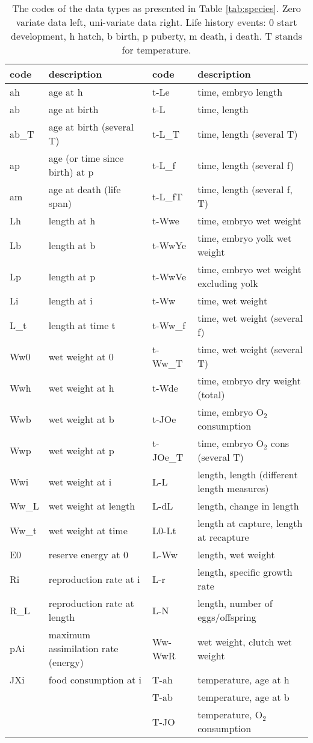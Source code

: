 \documentclass{article}
\begin{document}
\clearpage

\begin{table}[h!]\small
\caption{\label{tab:codes}\protect\small
The codes of the data types as presented in Table \ref{tab:species}.
Zero variate data left, uni-variate data right.
Life history events: 0 start development, h hatch, b birth, p puberty, m death, i death.
T stands for temperature.}
\begin{tabular}{ll|ll} \hline
\textbf{code} & \textbf{description} & \textbf{code} & \textbf{description}\\ \hline
ah & age at h & t-Le & time, embryo length\\ 
ab & age at birth & t-L & time, length\\ 
ab\_T & age at birth (several T) & t-L\_T & time, length (several T)\\ 
ap & age (or time since birth) at p & t-L\_f & time, length (several f)\\ 
am & age at death (life span) & t-L\_fT & time, length (several f, T)\\ 
Lh & length at h & t-Wwe & time, embryo wet weight\\ 
Lb & length at b & t-WwYe & time, embryo yolk wet weight\\ 
Lp & length at p & t-WwVe & time, embryo wet weight excluding yolk\\ 
Li & length at i & t-Ww & time, wet weight\\ 
L\_t & length at time t & t-Ww\_f & time, wet weight (several f)\\ 
Ww0 & wet weight at 0 & t-Ww\_T & time, wet weight (several T)\\ 
Wwh & wet weight at h & t-Wde & time, embryo dry weight (total)\\ 
Wwb & wet weight at b & t-JOe & time, embryo O$_2$ consumption\\ 
Wwp & wet weight at p & t-JOe\_T & time, embryo O$_2$ cons (several T)\\ 
Wwi & wet weight at i & L-L & length, length (different length measures)\\ 
Ww\_L & wet weight at length & L-dL & length, change in length\\ 
Ww\_t & wet weight at time & L0-Lt & length at capture, length at recapture\\ 
E0 & reserve energy at 0 & L-Ww & length, wet weight\\ 
Ri & reproduction rate at i & L-r & length, specific growth rate\\ 
R\_L & reproduction rate at length & L-N & length, number of eggs/offspring\\ 
pAi & maximum assimilation rate (energy) & Ww-WwR & wet weight, clutch wet weight\\ 
JXi & food consumption at i & T-ah & temperature, age at h\\ 
  &   & T-ab & temperature, age at b\\ 
  &   & T-JO & temperature, O$_2$ consumption\\ 
\hline
\end{tabular}
\end{table}
\end{document}
